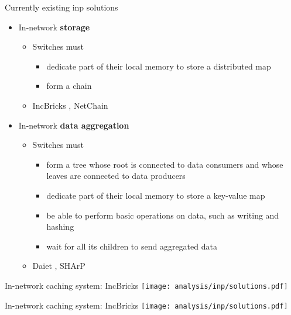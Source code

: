 \begin{frame}{Currently existing \gls{inp} solutions}
    \begin{itemize}
        \item In-network \textbf{storage}
        \begin{itemize}
        \item Switches must
        \begin{itemize}
            \item dedicate part of their local memory to store a distributed map
            \item form a chain
        \end{itemize}
        \item IncBricks \cite{incbricks}, NetChain \cite{netchain}
        \end{itemize}
            \item In-network \textbf{data aggregation}
        \begin{itemize}
        \item Switches must
        \begin{itemize}
            \item form a tree whose root is connected to data consumers and whose leaves are connected to data producers
            \item dedicate part of their local memory to store a key-value map
            \item be able to perform basic operations on data, such as writing and hashing
            \item wait for all its children to send aggregated data
        \end{itemize}
        \item Daiet \cite{daiet}, SHArP \cite{sharp}
        \end{itemize}
    \end{itemize}
\end{frame}

\begin{frame}{In-network caching system: IncBricks}
    \centering
    \texttt{[image: analysis/inp/solutions.pdf]}
\end{frame}

\begin{frame}{In-network caching system: IncBricks}
    \centering
    \texttt{[image: analysis/inp/solutions.pdf]}
\end{frame}

